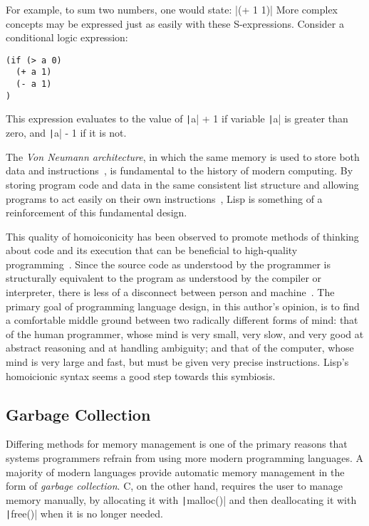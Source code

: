 \documentclass[11pt]{article}
\theoremstyle{break}
\begin{document}
For example, to sum two numbers, one would state:
|(+ 1 1)|
More complex concepts may be expressed just as easily with these S-expressions. Consider a conditional logic expression:
\begin{verbatim}
(if (> a 0)
  (+ a 1)
  (- a 1)
)
\end{verbatim}
This expression evaluates to the value of \texttt|a| + 1 if variable \texttt|a| is greater than zero, and \texttt|a| - 1 if it is not.

The \textit{Von Neumann architecture}, in which the same memory is used to store both data and instructions~\cite{von1993first}, is fundamental to the history of modern computing. By storing program code and data in the same consistent list structure and allowing programs to act easily on their own instructions~\cite{Smith:1984:RSL:800017.800513}, Lisp is something of a reinforcement of this fundamental design.

This quality of homoiconicity has been observed to promote methods of thinking about code and its execution that can be beneficial to high-quality programming~\cite{sicp,raymond2003become}. Since the source code as understood by the programmer is structurally equivalent to the program as understood by the compiler or interpreter, there is less of a disconnect between person and machine~\cite{sicp}. The primary goal of programming language design, in this author's opinion, is to find a comfortable middle ground between two radically different forms of mind: that of the human programmer, whose mind is very small, very slow, and very good at abstract reasoning and at handling ambiguity; and that of the computer, whose mind is very large and fast, but must be given very precise instructions. Lisp's homoicionic syntax seems a good step towards this symbiosis.

\subsection{Garbage Collection}\label{subsec:gc}

Differing methods for memory management is one of the primary reasons that systems programmers refrain from using more modern programming languages. A majority of modern languages provide automatic memory management in the form of \textit{garbage collection}. C, on the other hand, requires the user to manage memory manually, by allocating it with \texttt|malloc()| and then deallocating it with \texttt|free()| when it is no longer needed.
\end{document}

